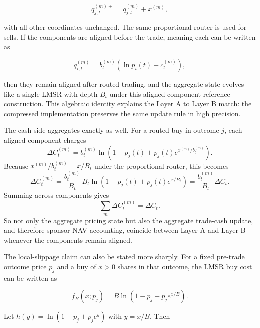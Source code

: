 \documentclass[10pt]{article}
\begin{document}
\[
q_{j,t}^{(m)+} = q_{j,t}^{(m)} + x^{(m)},
\]

with all other coordinates unchanged. The same proportional router is used for sells. If the components are aligned before the trade, meaning each can be written as

\[
q_{i,t}^{(m)} = b_t^{(m)}(\ln p_i(t) + c_t^{(m)}),
\]

then they remain aligned after routed trading, and the aggregate state evolves like a single LMSR with depth $B_t$ under this aligned-component reference construction. This algebraic identity explains the Layer A to Layer B match: the compressed implementation preserves the same update rule in high precision.

The cash side aggregates exactly as well. For a routed buy in outcome $j$, each aligned component charges
\[
\Delta C_t^{(m)} = b_t^{(m)} \ln\!\left(1-p_j(t) + p_j(t)e^{x^{(m)}/b_t^{(m)}}\right).
\]
Because $x^{(m)}/b_t^{(m)} = x/B_t$ under the proportional router, this becomes
\[
\Delta C_t^{(m)} = \frac{b_t^{(m)}}{B_t} \, B_t \ln\!\left(1-p_j(t) + p_j(t)e^{x/B_t}\right)
= \frac{b_t^{(m)}}{B_t}\Delta C_t.
\]
Summing across components gives
\[
\sum_m \Delta C_t^{(m)} = \Delta C_t.
\]
So not only the aggregate pricing state but also the aggregate trade-cash update, and therefore sponsor NAV accounting, coincide between Layer A and Layer B whenever the components remain aligned.

\begin{center}
\setlength{\fboxsep}{8pt}
\end{center}

The local-slippage claim can also be stated more sharply. For a fixed pre-trade outcome price $p_j$ and a buy of $x>0$ shares in that outcome, the LMSR buy cost can be written as

\[
f_B(x;p_j) = B \ln\!\left(1-p_j + p_j e^{x/B}\right).
\]

Let $h(y) = \ln(1-p_j + p_j e^y)$ with $y=x/B$. Then
\end{document}
